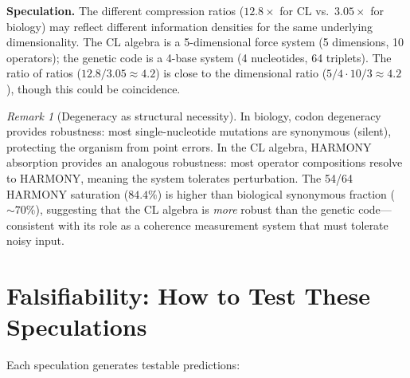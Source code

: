 \documentclass[11pt]{article}
\theoremstyle{definition}
\theoremstyle{remark}
\newtheorem{remark}[theorem]{Remark}
\begin{document}
\textbf{Speculation.}
The different compression ratios ($12.8\times$ for CL vs.\ $3.05\times$ for
biology) may reflect different information densities for the same underlying
dimensionality.  The CL algebra is a 5-dimensional force system (5 dimensions,
10 operators); the genetic code is a 4-base system (4 nucleotides, 64 triplets).
The ratio of ratios ($12.8 / 3.05 \approx 4.2$) is close to the dimensional
ratio ($5/4 \cdot 10/3 \approx 4.2$), though this could be coincidence.

\begin{remark}[Degeneracy as structural necessity]
In biology, codon degeneracy provides robustness: most single-nucleotide mutations
are synonymous (silent), protecting the organism from point errors.  In the CL
algebra, HARMONY absorption provides an analogous robustness: most operator
compositions resolve to HARMONY, meaning the system tolerates perturbation.
The 54/64 HARMONY saturation ($84.4\%$) is higher than biological synonymous
fraction ($\sim 70\%$), suggesting that the CL algebra is \emph{more} robust
than the genetic code---consistent with its role as a coherence measurement
system that must tolerate noisy input.
\end{remark}

\section{Falsifiability: How to Test These Speculations}
\label{sec:falsify}

Each speculation generates testable predictions:
\end{document}
